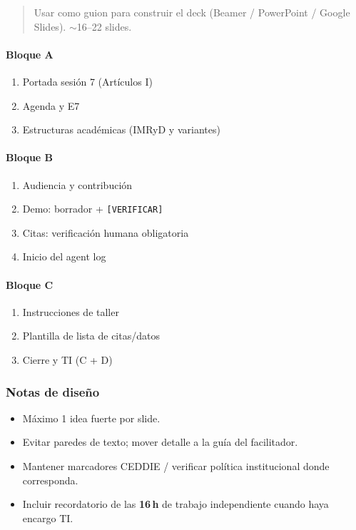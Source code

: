 \begin{quote}
Usar como guion para construir el deck (Beamer / PowerPoint / Google Slides). $\sim$16--22 slides.
\end{quote}

\paragraph{Bloque A}\begin{enumerate}
\item Portada sesión 7 (Artículos I)
\item Agenda y E7
\item Estructuras académicas (IMRyD y variantes)
\end{enumerate}
\paragraph{Bloque B}\begin{enumerate}
\item Audiencia y contribución
\item Demo: borrador + \texttt{[VERIFICAR]}
\item Citas: verificación humana obligatoria
\item Inicio del agent log
\end{enumerate}
\paragraph{Bloque C}\begin{enumerate}
\item Instrucciones de taller
\item Plantilla de lista de citas/datos
\item Cierre y TI (C + D)
\end{enumerate}

\subsubsection*{Notas de diseño}
\begin{itemize}
\item Máximo 1 idea fuerte por slide.
\item Evitar paredes de texto; mover detalle a la guía del facilitador.
\item Mantener marcadores CEDDIE / verificar política institucional donde corresponda.
\item Incluir recordatorio de las \textbf{16\,h} de trabajo independiente cuando haya encargo TI.
\end{itemize}

